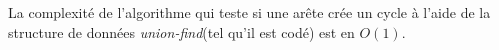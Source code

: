 La complexité de l'algorithme qui teste si une arête crée un cycle à l'aide de la structure de données \emph{union-find}(tel qu'il est codé) est en $O(1)$.